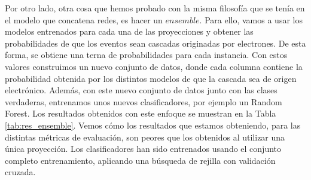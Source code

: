 \documentclass[a4paper,12pt,oneside,titlepage]{book}
\begin{document}
Por otro lado, otra cosa que hemos probado con la misma filosofía que se tenía en el modelo que concatena redes, es hacer un $ensemble$. Para ello, vamos a usar los modelos entrenados para cada una de las proyecciones y obtener las probabilidades de que los eventos sean cascadas originadas por electrones. De esta forma, se obtiene una terna de probabilidades para cada instancia. Con estos valores construimos un nuevo conjunto de datos, donde cada columna contiene la probabilidad obtenida por los distintos modelos de que la cascada sea de origen electrónico. Además, con este nuevo conjunto de datos junto con las clases verdaderas, entrenamos unos nuevos clasificadores, por ejemplo un Random Forest. Los resultados obtenidos con este enfoque se muestran en la Tabla \ref{tab:res_ensemble}. Vemos cómo los resultados que estamos obteniendo, para las distintas métricas de evaluación, son peores que los obtenidos al utilizar una única proyección. Los clasificadores han sido entrenados usando el conjunto completo entrenamiento, aplicando una búsqueda de rejilla con validación cruzada.
\end{document}
